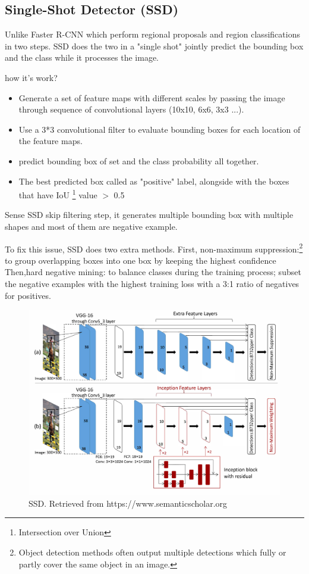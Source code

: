 \documentclass[12pt]{report}
\begin{document}
\subsection{Single-Shot Detector (SSD)}

Unlike Faster R-CNN which perform regional proposals 
and region classifications in two steps. SSD does the two in a "single shot"
jointly predict the bounding box and the class while it processes the image.

how it's work?
\begin{itemize}
    \item Generate a set of feature maps with different scales by passing 
    the image through sequence of convolutional layers (10x10, 6x6, 3x3 ...).
    \item Use a 3*3 convolutional filter to evaluate bounding boxes for each 
    location of the feature maps.
    \item predict bounding box of set and the class probability all together.
    \item The best predicted box called as "positive" label, alongside with
    the boxes that have IoU \footnote{Intersection over Union } value $>$ 0.5 
\end{itemize}
Sense SSD skip filtering step, it generates multiple bounding box with multiple shapes
and most of them are negative example.

To fix this issue, SSD does two extra methods.
First, non-maximum suppression:\footnote{Object detection methods often output 
multiple detections which fully or partly cover the same object in an image.}
to group overlapping boxes into one box by keeping the highest confidence
Then,hard negative mining: to balance classes during the training process; 
subset the negative examples with the highest training loss with a 3:1 ratio 
of negatives for positives.\cite{Liu2016}

\begin{figure}[h]
    \centering
    \includegraphics[width=.7\textwidth]{./images/ssd.png}
    \caption{SSD. Retrieved from https://www.semanticscholar.org}
    \label{fig:frcnn}
\end{figure} 
\end{document}
